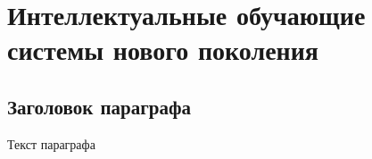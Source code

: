 \chapter{Интеллектуальные обучающие системы нового поколения}
\label{chapter_learning_systems}


\section{Заголовок параграфа}
Текст параграфа

%